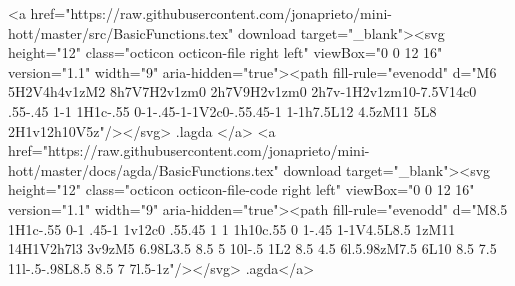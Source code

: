 {        <a href="https://raw.githubusercontent.com/jonaprieto/mini-hott/master/src/BasicFunctions.tex" download target="_blank"><svg height="12" class="octicon octicon-file right left" viewBox="0 0 12 16" version="1.1" width="9" aria-hidden="true"><path fill-rule="evenodd" d="M6 5H2V4h4v1zM2 8h7V7H2v1zm0 2h7V9H2v1zm0 2h7v-1H2v1zm10-7.5V14c0 .55-.45 1-1 1H1c-.55 0-1-.45-1-1V2c0-.55.45-1 1-1h7.5L12 4.5zM11 5L8 2H1v12h10V5z"/></svg> .lagda </a>
        <a href="https://raw.githubusercontent.com/jonaprieto/mini-hott/master/docs/agda/BasicFunctions.tex" download target="_blank"><svg height="12" class="octicon octicon-file-code right left" viewBox="0 0 12 16" version="1.1" width="9" aria-hidden="true"><path fill-rule="evenodd" d="M8.5 1H1c-.55 0-1 .45-1 1v12c0 .55.45 1 1 1h10c.55 0 1-.45 1-1V4.5L8.5 1zM11 14H1V2h7l3 3v9zM5 6.98L3.5 8.5 5 10l-.5 1L2 8.5 4.5 6l.5.98zM7.5 6L10 8.5 7.5 11l-.5-.98L8.5 8.5 7 7l.5-1z"/></svg> .agda</a>
      
}
